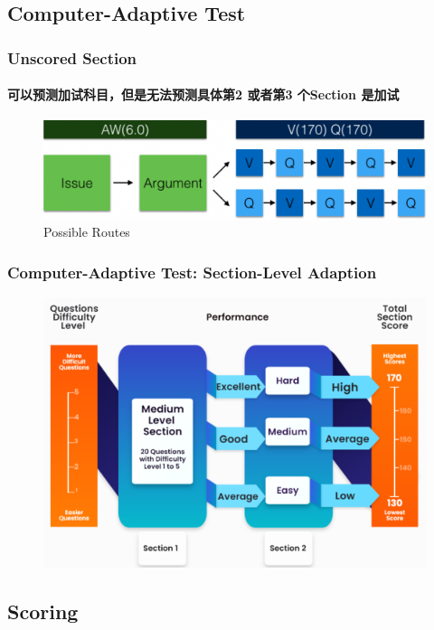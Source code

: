 \documentclass[
	11pt, %
]{beamer}
\begin{document}
\subsection{Computer-Adaptive Test}

\begin{frame}
	\frametitle{Unscored Section}
	\framesubtitle{ 可以预测加试科目，但是无法预测具体第2 或者第3 个Section 是加试}
	
	\begin{figure}
		\includegraphics[width=0.9\linewidth]{Unscored_section.png}
		\caption{Possible Routes}
	\end{figure}
\end{frame}


\begin{frame}
	\frametitle{Computer-Adaptive Test: Section-Level Adaption}
	
	\begin{figure}
		\includegraphics[width=0.9\linewidth]{GRE_Section_Adaptive.png}
	\end{figure}
\end{frame}

\subsection{Scoring}
\end{document}
